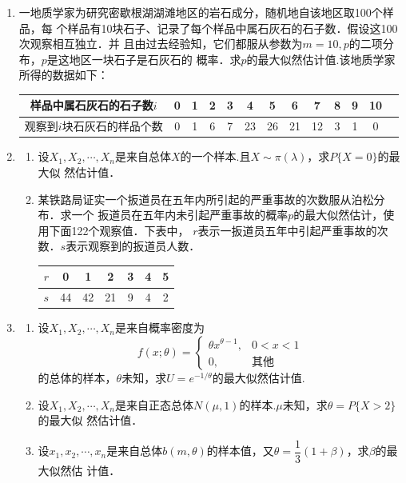 \begin{enumerate}
    \item 一地质学家为研究密歇根湖湖滩地区的岩石成分，随机地自该地区取100个样品，每
    个样品有10块石子、记录了每个样品中属石灰石的石子数．假设这100次观察相互独立．并
    且由过去经验知，它们都服从参数为$m=10,p$的二项分布，$p$是这地区一块石子是石灰石的
    概率．求$p$的最大似然估计值.该地质学家所得的数据如下：
    \renewcommand{\arraystretch}{1.3}
    \begin{table}[H]\centering
        \begin{tabular}{c|cccccccccccc}
        样品中属石灰石的石子数$i$   & 0   & 1  & 2 & 3 & 4 & 5 & 6 & 7 & 8 & 9 & 10 \\ \hline
        观察到$i$块石灰石的样品个数 & 0 & 1 & 6 & 7 & 23 & 26 & 21 & 12 & 3 & 1 & 0 
        \end{tabular}
    \end{table}
    \renewcommand{\arraystretch}{1.0}




    \item \begin{enumerate}
        \item 设$X_1,X_2,\cdots,X_n$是来自总体$X$的一个样本.且$X\sim \pi(\lambda)$，求$P\{X=0\}$的最大似
        然估计值．
        \item 某铁路局证实一个扳道员在五年内所引起的严重事故的次数服从泊松分布．求一个
        扳道员在五年内未引起严重事故的概率$p$的最大似然估计，使用下面122个观察值．下表中，
        $r$表示一扳道员五年中引起严重事故的次数．$s$表示观察到的扳道员人数．
        \renewcommand{\arraystretch}{1.3}
        \begin{table}[H]\centering
            \begin{tabular}{c|cccccc}
            $r$ & 0 & 1 & 2 & 3 & 4 & 5   \\ \hline
            $s$ & 44 & 42 & 21 & 9 & 4 & 2
            \end{tabular}
        \end{table}
        \renewcommand{\arraystretch}{1.0}
    \end{enumerate}
    



    \item \begin{enumerate}
        \item 设$X_1,X_2,\cdots,X_n$是来自概率密度为
        $$f(x;\theta)=\left\{\begin{array}{ll}
            \theta x^{\theta-1}, & 0<x<1\\
            0, & \mbox{其他}
        \end{array}\right.$$
        的总体的样本，$\theta$未知，求$U=e^{-1/\theta}$的最大似然估计值.
        \item 设$X_1,X_2,\cdots,X_n$是来自正态总体$N(\mu,1)$的样本.$\mu$未知，求$\theta=P\{X>2\}$的最大似
        然估计值．
        \item 设$x_1,x_2,\cdots,x_n$是来自总体$b(m,\theta)$的样本值，又$\theta=\dfrac{1}{3}(1+\beta)$，求$\beta$的最大似然估
        计值．
    \end{enumerate}
    





\end{enumerate}
